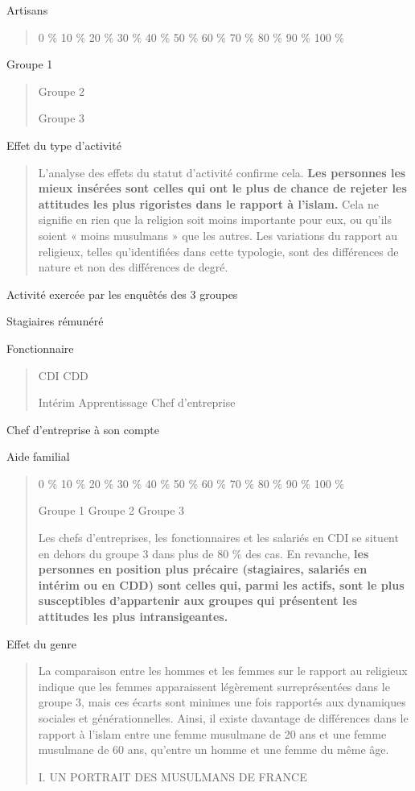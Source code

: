 Artisans

\begin{quote}
0 \% 10 \% 20 \% 30 \% 40 \% 50 \% 60 \% 70 \% 80 \% 90 \% 100 \%
\end{quote}

Groupe 1

\begin{quote}
Groupe 2

Groupe 3


\end{quote}

Effet du type d'activité

\begin{quote}
L'analyse des effets du statut d'activité confirme cela. \textbf{Les
personnes les mieux insérées sont celles qui ont le plus de chance de
rejeter les attitudes les plus rigoristes dans le rapport à l'islam.}
Cela ne signifie en rien que la religion soit moins importante pour eux,
ou qu'ils soient « moins musulmans » que les autres. Les variations du
rapport au religieux, telles qu'identifiées dans cette typologie, sont
des différences de nature et non des différences de degré.
\end{quote}

Activité exercée par les enquêtés des 3 groupes

Stagiaires rémunéré

Fonctionnaire

\begin{quote}
CDI CDD

Intérim Apprentissage Chef d'entreprise
\end{quote}

Chef d'entreprise à son compte

Aide familial

\begin{quote}
0 \% 10 \% 20 \% 30 \% 40 \% 50 \% 60 \% 70 \% 80 \% 90 \% 100 \%

Groupe 1 Groupe 2 Groupe 3

Les chefs d'entreprises, les fonctionnaires et les salariés en CDI se
situent en dehors du groupe 3 dans plus de 80 \% des cas. En revanche,
\textbf{les personnes en position plus précaire (stagiaires, salariés en
intérim ou en CDD) sont celles qui, parmi les actifs, sont le plus
susceptibles d'appartenir aux groupes qui présentent les attitudes les
plus intransigeantes.}
\end{quote}

Effet du genre

\begin{quote}
La comparaison entre les hommes et les femmes sur le rapport au
religieux indique que les femmes apparaissent légèrement surreprésentées
dans le groupe 3, mais ces écarts sont minimes une fois rapportés aux
dynamiques sociales et générationnelles. Ainsi, il existe davantage de
différences dans le rapport à l'islam entre une femme musulmane de 20
ans et une femme musulmane de 60 ans, qu'entre un homme et une femme du
même âge.

I. UN PORTRAIT DES MUSULMANS DE FRANCE
\end{quote}

